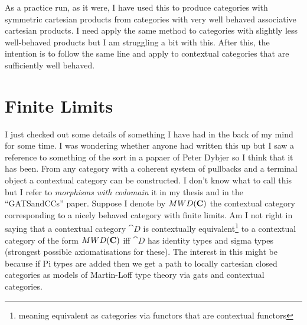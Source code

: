 \documentclass[10pt,a4paper]{article}
\theoremstyle{remark}
\begin{document}
As a practice run, as it were, I have used this to produce categories with symmetric cartesian products from categories with very well behaved associative cartesian products. I need apply the same method to categories with slightly less well-behaved products but I am struggling a bit with this. After this, the intention is to follow the same line and apply to contextual categories that are sufficiently well behaved.

\section{Finite Limits}
\note 
I just checked out some details of something I have had in the back of my mind for some time. 
I was wondering whether anyone had written this up but I saw a reference to something of the sort in a papaer of Peter Dybjer so I think that it  has been.
 From any category with a coherent system of pullbacks and a terminal object a contextual category can be constructed. I don't know what to call this but 
I refer to \textit{morphisms with codomain} it in my thesis and in the ``GATSandCCs'' paper.
Suppose I denote by $MWD(\textbf{C})$ the contextual category corresponding to a nicely behaved category \catcw with finite limits. Am I not right in saying that a contextual category $\cat{D}$ is contextually equivalent\footnote{meaning equivalent as categories via functors that are contextual functors} to 
a contextual category of the form $MWD(\textbf{C})$ iff $\cat{D}$ has identity types and sigma types
(strongest possible axiomatisations for these). The interest in this might be because if Pi types are added then we get  a path to locally cartesian closed categories as models of Martin-Loff type theory via gats and contextual categories. 
\end{document}
